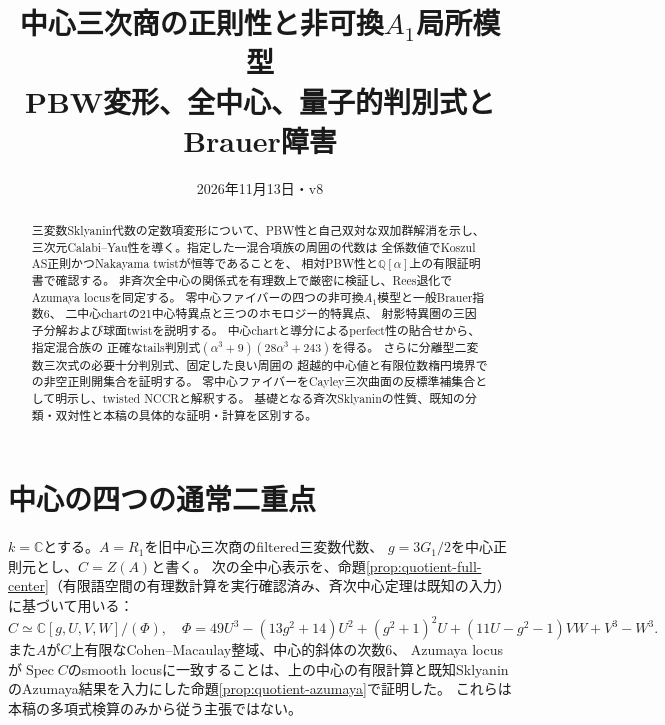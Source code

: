 \documentclass[11pt,a4paper]{ltjsarticle}
\title{中心三次商の正則性と非可換$A_1$局所模型\\
\large PBW変形、全中心、量子的判別式とBrauer障害}
\date{2026年11月13日・v8}
\newcommand{\CC}{\mathbb C}
\newcommand{\Spec}{\operatorname{Spec}}
\begin{document}
\maketitle
\begin{abstract}
三変数Sklyanin代数の定数項変形について、PBW性と自己双対な双加群解消を示し、
三次元Calabi--Yau性を導く。指定した一混合項族の周囲の代数は
全係数値でKoszul AS正則かつNakayama twistが恒等であることを、
相対PBW性と$\mathbb Q[\alpha]$上の有限証明書で確認する。
非斉次全中心の関係式を有理数上で厳密に検証し、Rees退化でAzumaya locusを同定する。
零中心ファイバーの四つの非可換$A_1$模型と一般Brauer指数6、
二中心chartの21中心特異点と三つのホモロジー的特異点、
射影特異圏の三因子分解および球面twistを説明する。
中心chartと導分によるperfect性の貼合せから、指定混合族の
正確なtails判別式$(\alpha^3+9)(28\alpha^3+243)$を得る。
さらに分離型二変数三次式の必要十分判別式、固定した良い周囲の
超越的中心値と有限位数楕円境界での非空正則開集合を証明する。
零中心ファイバーをCayley三次曲面の反標準補集合として明示し、twisted NCCRと解釈する。
基礎となる斉次Sklyaninの性質、既知の分類・双対性と本稿の具体的な証明・計算を区別する。
\end{abstract}





\section{中心の四つの通常二重点}
$k=\CC$とする。$A=R_1$を旧中心三次商のfiltered三変数代数、
$g=3G_1/2$を中心正則元とし、$C=Z(A)$と書く。
次の全中心表示を、命題\ref{prop:quotient-full-center}（有限語空間の有理数計算を実行確認済み、斉次中心定理は既知の入力）に基づいて用いる：
\begin{equation}\label{eq:center}
 C\simeq
 \CC[g,U,V,W]/(\Phi),\quad
 \Phi=49U^3-(13g^2+14)U^2+(g^2+1)^2U
 +(11U-g^2-1)VW+V^3-W^3 .
\end{equation}
また$A$が$C$上有限なCohen--Macaulay整域、中心的斜体の次数6、
Azumaya locusが$\Spec C$のsmooth locusに一致することは、上の中心の有限計算と既知SklyaninのAzumaya結果を入力にした命題\ref{prop:quotient-azumaya}で証明した。
これらは本稿の多項式検算のみから従う主張ではない。
\end{document}
